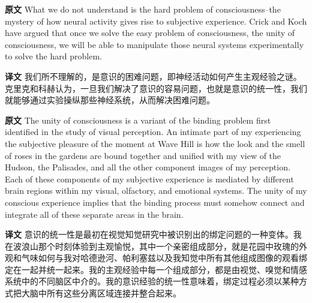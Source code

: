 \documentclass[UTF8]{ctexart}
\newenvironment{english}{\par\small\noindent\textbf{原文}\quad\ignorespaces}{\par}
\newenvironment{zhtranslation}{\par\noindent\textbf{译文}\quad\ignorespaces}{\par\vspace{0.35em}}
\begin{document}
\begin{english}
What we do not understand is the hard problem of consciousness--the mystery of how neural activity gives rise to subjective experience. Crick and Koch have argued that once we solve the easy problem of consciousness, the unity of consciousness, we will be able to manipulate those neural systems experimentally to solve the hard problem.
\end{english}
\begin{zhtranslation}
我们所不理解的，是意识的困难问题，即神经活动如何产生主观经验之谜。克里克和科赫认为，一旦我们解决了意识的容易问题，也就是意识的统一性，我们就能够通过实验操纵那些神经系统，从而解决困难问题。\end{zhtranslation}

\begin{english}
The unity of consciousness is a variant of the binding problem first identified in the study of visual perception. An intimate part of my experiencing the subjective pleasure of the moment at Wave Hill is how the look and the smell of roses in the gardens are bound together and unified with my view of the Hudson, the Palisades, and all the other component images of my perception. Each of these components of my subjective experience is mediated by different brain regions within my visual, olfactory, and emotional systems. The unity of my conscious experience implies that the binding process must somehow connect and integrate all of these separate areas in the brain.
\end{english}
\begin{zhtranslation}
意识的统一性是最初在视觉知觉研究中被识别出的绑定问题的一种变体。我在波浪山那个时刻体验到主观愉悦，其中一个亲密组成部分，就是花园中玫瑰的外观和气味如何与我对哈德逊河、帕利塞兹以及我知觉中所有其他组成图像的观看绑定在一起并统一起来。我的主观经验中每一个组成部分，都是由视觉、嗅觉和情感系统中的不同脑区中介的。我的意识经验的统一性意味着，绑定过程必须以某种方式把大脑中所有这些分离区域连接并整合起来。\end{zhtranslation}
\end{document}
